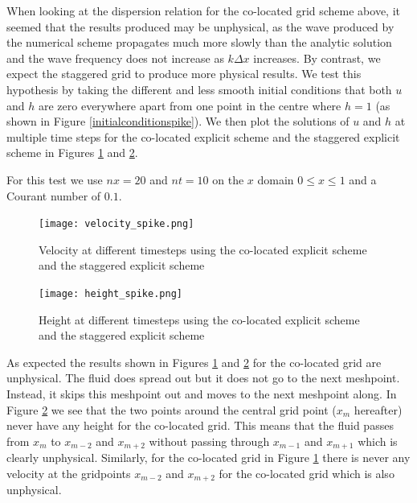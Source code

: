\documentclass[a4paper, 10.8pt, notitlepage]{article}
\begin{document}
When looking at the dispersion relation for the co-located grid scheme above, it seemed that the results produced may be unphysical, as the wave produced by the numerical scheme propagates much more slowly than the analytic solution and the wave frequency does not increase as $k\Delta x$ increases. By contrast, we expect the staggered grid to produce more physical results. We test this hypothesis by taking the different and less smooth initial conditions that both $u$ and $h$ are zero everywhere apart from one point in the centre where $h = 1$ (as shown in Figure \ref{initialconditionspike}). We then plot the solutions of $u$ and $h$ at multiple time steps for the co-located explicit scheme and the staggered explicit scheme in Figures \ref{velocity_spike} and \ref{height_spike}.

For this test we use $nx = 20$ and $nt = 10$ on the $x$ domain $0 \leq x \leq 1$ and a Courant number of $0.1$.

\begin{figure} [H]
	\begin{center}
	\begin{minipage}{.6\textwidth}
		\ContinuedFloat*
		\captionsetup{width=1.5\textwidth}
		\captionsetup{justification=centering}
		\texttt{[image: velocity\_spike.png]}
		\caption{\label{velocity_spike} Velocity at different timesteps using the co-located explicit scheme and the staggered explicit scheme} 
	\end{minipage}
\end{center}
\end{figure}
\begin{figure}[H]
	\begin{center}
	\begin{minipage}{.6\textwidth}
		\ContinuedFloat
		\captionsetup{width=1.5\textwidth}
		\captionsetup{justification=centering}
		\texttt{[image: height\_spike.png]}
		\caption{\label{height_spike} Height at different timesteps using the co-located explicit scheme and the staggered explicit scheme} 
	\end{minipage}
\end{center}
\end{figure}

As expected the results shown in Figures \ref{velocity_spike} and \ref{height_spike} for the co-located grid are unphysical. The fluid does spread out but it does not go to the next meshpoint. Instead, it skips this meshpoint out and moves to the next meshpoint along. In Figure \ref{height_spike} we see that the two points around the central grid point ($x_{m}$ hereafter) never have any height for the co-located grid. This means that the fluid passes from $x_{m}$ to $x_{m-2}$ and $x_{m+ 2}$ without passing through $x_{m-1}$ and $x_{m+1}$ which is clearly unphysical. Similarly, for the co-located grid in Figure \ref{velocity_spike} there is never any velocity at the gridpoints $x_{m-2}$ and $x_{m+2}$ for the co-located grid which is also unphysical. 
\end{document}
